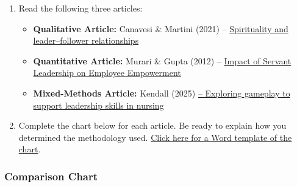 \documentclass[
  letterpaper,
  DIV=11,
  numbers=noendperiod]{scrreprt}
\providecommand{\tightlist}{%
  \setlength{\itemsep}{0pt}\setlength{\parskip}{0pt}}\usepackage{longtable,booktabs,array}
\begin{document}
\begin{enumerate}
\def\labelenumi{\arabic{enumi}.}
\tightlist
\item
  Read the following three articles:

  \begin{itemize}
  \tightlist
  \item
    \textbf{Qualitative Article:} Canavesi \& Martini (2021) --
    \href{https://mytwu-my.sharepoint.com/personal/jodi_mcbride_twu_ca/Documents/Documents/591\%20Curriculum\%20Revision/Articles/Canavesi\%20SL\%20Qualitative.pdf}{Spirituality
    and leader--follower relationships}
  \item
    \textbf{Quantitative Article:} Murari \& Gupta (2012) --
    \href{https://mytwu-my.sharepoint.com/personal/jodi_mcbride_twu_ca/Documents/Documents/591\%20Curriculum\%20Revision/Articles/Gupta\%20Quant.pdf}{Impact
    of Servant Leadership on Employee Empowerment}
  \item
    \textbf{Mixed-Methods Article:} Kendall (2025)
    \href{https://mytwu-my.sharepoint.com/personal/jodi_mcbride_twu_ca/Documents/Documents/591\%20Curriculum\%20Revision/Articles/Kendall\%20mixed\%20methods\%20nursing.pdf}{--
    Exploring gameplay to support leadership skills in nursing}
  \end{itemize}
\item
  Complete the chart below for each article. Be ready to explain how you
  determined the methodology used.
  \href{https://mytwu-my.sharepoint.com/personal/jodi_mcbride_twu_ca/Documents/Documents/591\%20Curriculum\%20Revision/New\%20Support\%20Documents/Unit\%202\%20ID\%20types\%20of\%20research\%20learning\%20actvity\%20chart.docx}{Click
  here for a Word template of the chart}.
\end{enumerate}

\subsubsection*{Comparison Chart}\label{comparison-chart}
\end{document}
